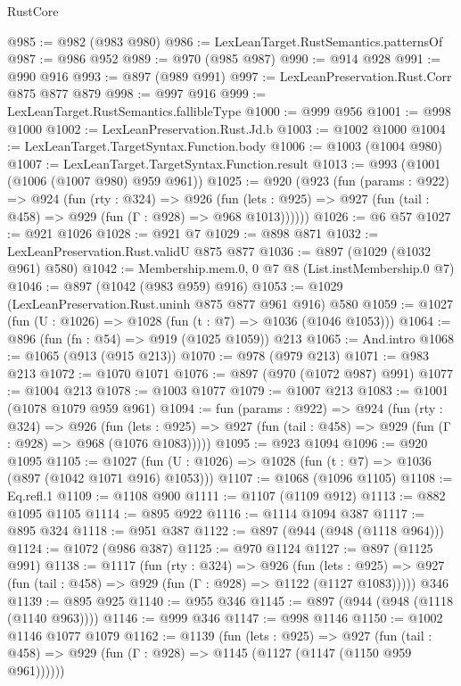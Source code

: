 \begin{lexlean}{RustCore}
\begin{coremodule}
@985 := @982 (@983 @980)
@986 := LexLeanTarget.RustSemantics.patternsOf
@987 := @986 @952
@989 := @970 (@985 @987)
@990 := @914 @928
@991 := @990 @916
@993 := @897 (@989 @991)
@997 := LexLeanPreservation.Rust.Corr @875 @877 @879
@998 := @997 @916
@999 := LexLeanTarget.RustSemantics.fallibleType
@1000 := @999 @956
@1001 := @998 @1000
@1002 := LexLeanPreservation.Rust.Jd.b
@1003 := @1002 @1000
@1004 := LexLeanTarget.TargetSyntax.Function.body
@1006 := @1003 (@1004 @980)
@1007 := LexLeanTarget.TargetSyntax.Function.result
@1013 := @993 (@1001 (@1006 (@1007 @980) @959 @961))
@1025 := @920
    (@923
      (fun (params : @922) =>
      @924
        (fun (rty : @324) =>
        @926
          (fun (lets : @925) => @927 (fun (tail : @458) => @929 (fun (Γ : @928) => @968 @1013))))))
@1026 := @6 @57
@1027 := @921 @1026
@1028 := @921 @7
@1029 := @898 @871
@1032 := LexLeanPreservation.Rust.validU @875 @877
@1036 := @897 (@1029 (@1032 @961) @580)
@1042 := Membership.mem.{0, 0} @7 @8 (List.instMembership.{0} @7)
@1046 := @897 (@1042 (@983 @959) @916)
@1053 := @1029 (LexLeanPreservation.Rust.uninh @875 @877 @961 @916) @580
@1059 := @1027 (fun (U : @1026) => @1028 (fun (t : @7) => @1036 (@1046 @1053)))
@1064 := @896 (fun (fn : @54) => @919 (@1025 @1059)) @213
@1065 := And.intro
@1068 := @1065 (@913 (@915 @213))
@1070 := @978 (@979 @213)
@1071 := @983 @213
@1072 := @1070 @1071
@1076 := @897 (@970 (@1072 @987) @991)
@1077 := @1004 @213
@1078 := @1003 @1077
@1079 := @1007 @213
@1083 := @1001 (@1078 @1079 @959 @961)
@1094 := fun (params : @922) =>
  @924
    (fun (rty : @324) =>
    @926
      (fun (lets : @925) =>
      @927 (fun (tail : @458) => @929 (fun (Γ : @928) => @968 (@1076 @1083)))))
@1095 := @923 @1094
@1096 := @920 @1095
@1105 := @1027 (fun (U : @1026) => @1028 (fun (t : @7) => @1036 (@897 (@1042 @1071 @916) @1053)))
@1107 := @1068 (@1096 @1105)
@1108 := Eq.refl.{1}
@1109 := @1108 @900
@1111 := @1107 (@1109 @912)
@1113 := @882 @1095 @1105
@1114 := @895 @922
@1116 := @1114 @1094 @387
@1117 := @895 @324
@1118 := @951 @387
@1122 := @897 (@944 (@948 (@1118 @964)))
@1124 := @1072 (@986 @387)
@1125 := @970 @1124
@1127 := @897 (@1125 @991)
@1138 := @1117
    (fun (rty : @324) =>
    @926
      (fun (lets : @925) =>
      @927 (fun (tail : @458) => @929 (fun (Γ : @928) => @1122 (@1127 @1083)))))
    @346
@1139 := @895 @925
@1140 := @955 @346
@1145 := @897 (@944 (@948 (@1118 (@1140 @963))))
@1146 := @999 @346
@1147 := @998 @1146
@1150 := @1002 @1146 @1077 @1079
@1162 := @1139
    (fun (lets : @925) =>
    @927 (fun (tail : @458) => @929 (fun (Γ : @928) => @1145 (@1127 (@1147 (@1150 @959 @961))))))

\end{coremodule}
\end{lexlean}
